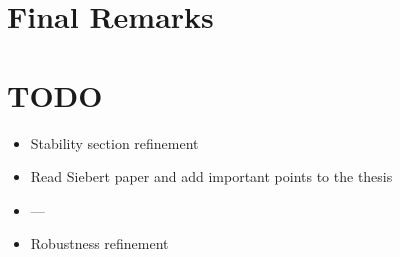 \section{Final Remarks}


\section{TODO}

\begin{itemize}
    \item Stability section refinement
    \item Read Siebert paper and add important points to the thesis
    \item  ---
    \item Robustness refinement
\end{itemize}
